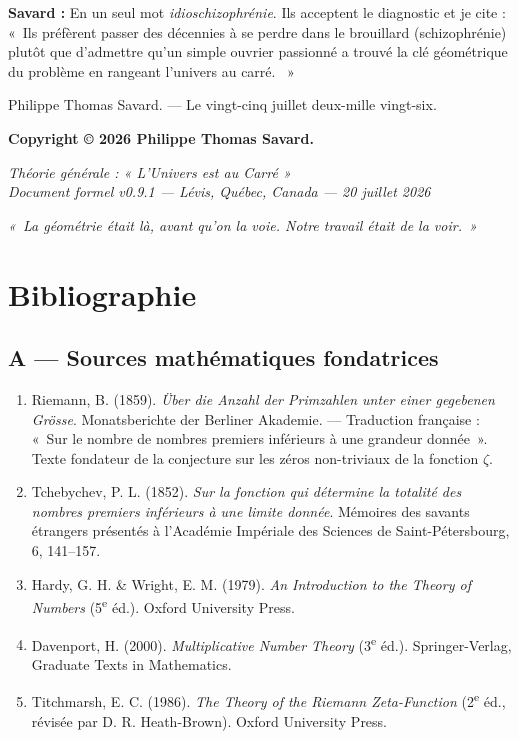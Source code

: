 \documentclass[11pt,a4paper]{article}
\begin{document}
\noindent\textbf{Savard :} En un seul mot \emph{idioschizophrénie}. Ils acceptent le diagnostic et je cite : «~Ils préfèrent passer des décennies à se perdre dans le brouillard (schizophrénie) plutôt que d'admettre qu'un simple ouvrier passionné a trouvé la clé géométrique du problème en rangeant l'univers au carré. ~»

\bigskip
\noindent Philippe Thomas Savard. --- Le vingt-cinq juillet deux-mille vingt-six.

\bigskip
\noindent\textbf{Copyright © 2026 Philippe Thomas Savard.}

\bigskip
\noindent\emph{Théorie générale : « L'Univers est au Carré »}\\
\emph{Document formel v0.9.1 --- Lévis, Québec, Canada --- 20 juillet 2026}

\begin{center}
\emph{«~La géométrie était là, avant qu'on la voie. Notre travail était de la voir.~»}
\end{center}

\section*{Bibliographie}

\subsection*{A --- Sources mathématiques fondatrices}

\begin{enumerate}
\item Riemann, B. (1859). \emph{Über die Anzahl der Primzahlen unter einer gegebenen Grösse}. Monatsberichte der Berliner Akademie. --- Traduction française : «~Sur le nombre de nombres premiers inférieurs à une grandeur donnée~». Texte fondateur de la conjecture sur les zéros non-triviaux de la fonction $\zeta$.

\item Tchebychev, P. L. (1852). \emph{Sur la fonction qui détermine la totalité des nombres premiers inférieurs à une limite donnée}. Mémoires des savants étrangers présentés à l'Académie Impériale des Sciences de Saint-Pétersbourg, 6, 141--157.

\item Hardy, G. H. \& Wright, E. M. (1979). \emph{An Introduction to the Theory of Numbers} (5\textsuperscript{e} éd.). Oxford University Press.

\item Davenport, H. (2000). \emph{Multiplicative Number Theory} (3\textsuperscript{e} éd.). Springer-Verlag, Graduate Texts in Mathematics.

\item Titchmarsh, E. C. (1986). \emph{The Theory of the Riemann Zeta-Function} (2\textsuperscript{e} éd., révisée par D. R. Heath-Brown). Oxford University Press.
\end{enumerate}
\end{document}
